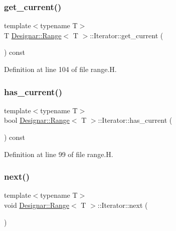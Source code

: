 \subsubsection{\texorpdfstring{get\+\_\+current()}{get\_current()}}
{\footnotesize\ttfamily template$<$typename T$>$ \\
T \hyperlink{class_designar_1_1_range}{Designar\+::\+Range}$<$ T $>$\+::Iterator\+::get\+\_\+current (\begin{DoxyParamCaption}{ }\end{DoxyParamCaption}) const\hspace{0.3cm}{\ttfamily [inline]}}



Definition at line 104 of file range.\+H.

\mbox{\label{class_designar_1_1_range_1_1_iterator_a9645d6d68aa53949d8c85d2af91e55c9}} 
\subsubsection{\texorpdfstring{has\+\_\+current()}{has\_current()}}
{\footnotesize\ttfamily template$<$typename T$>$ \\
bool \hyperlink{class_designar_1_1_range}{Designar\+::\+Range}$<$ T $>$\+::Iterator\+::has\+\_\+current (\begin{DoxyParamCaption}{ }\end{DoxyParamCaption}) const\hspace{0.3cm}{\ttfamily [inline]}}



Definition at line 99 of file range.\+H.

\mbox{\label{class_designar_1_1_range_1_1_iterator_ad337cc1a463bd9ebea6691efdc5b7b4f}} 
\subsubsection{\texorpdfstring{next()}{next()}}
{\footnotesize\ttfamily template$<$typename T$>$ \\
void \hyperlink{class_designar_1_1_range}{Designar\+::\+Range}$<$ T $>$\+::Iterator\+::next (\begin{DoxyParamCaption}{ }\end{DoxyParamCaption})\hspace{0.3cm}{\ttfamily [inline]}}



